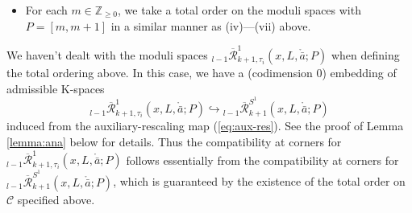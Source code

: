 \documentclass[a4paper]{article}
\numberwithin{equation}{section}
\begin{document}
\begin{itemize}
    \begin{equation}
    \left\{{}_l\overline{\mathcal{M}}(x_1,x_2;\{m\})|A_{H_t}(x_1)-A_{H_t}(x_2)=c\right\},
    \end{equation}
    \begin{equation}
    \left\{\overline{\mathcal{R}}_{k+1}(L,\bar{a};\{m\})|\theta_M(a)+(k-1)\varepsilon=c\right\},
    \end{equation}
    \begin{equation}
    \left\{\overline{\mathcal{R}}_{k+2,\vartheta}(L,\bar{a};\{m\})|\theta_M(a)+(k-1)\varepsilon=c\right\},
    \end{equation}
    \begin{equation}
    \left\{{}_l^{j,j+1}\overline{\mathcal{R}}_{k+1}^1(x,L,\ring{\bar{a}};\{m\})|\theta_M(a)+(k-1)\varepsilon=c\right\},
    \end{equation}
    \begin{equation}
    \left\{{}_{l-1}\overline{\mathcal{R}}_{k+1}^{S^1}(x,L,\ring{\bar{a}};\{m\})|\theta_M(a)+(k-1)\varepsilon=c\right\},
    \end{equation}
    \begin{equation}
    \left\{{}_l\overline{\mathcal{R}}_{k+1}^1(x,L,\ring{\bar{a}};\{m\})|\theta_M(a)+(k-1)\varepsilon=c\right\}.
    \end{equation}
    \item[(viii)] For each $m\in\mathbb{Z}_{\geq0}$, we take a total order on the moduli spaces with $P=[m,m+1]$ in a similar manner as (iv)---(vii) above.
\end{itemize}

We haven't dealt with the moduli spaces ${}_{l-1}\overline{\mathcal{R}}_{k+1,\tau_i}^1(x,L,\ring{\bar{a}};P)$ when defining the total ordering above. In this case, we have a (codimension 0) embedding of admissible K-spaces
\begin{equation}
{}_{l-1}\overline{\mathcal{R}}_{k+1,\tau_i}^1(x,L,\ring{\bar{a}};P)\hookrightarrow{}_{l-1}\overline{\mathcal{R}}_{k+1}^{S^1}(x,L,\ring{\bar{a}};P)
\end{equation}
induced from the auxiliary-rescaling map (\ref{eq:aux-res}). See the proof of Lemma \ref{lemma:ana} below for details. Thus the compatibility at corners for ${}_{l-1}\overline{\mathcal{R}}_{k+1,\tau_i}^1(x,L,\ring{\bar{a}};P)$ follows essentially from the compatibility at corners for ${}_{l-1}\overline{\mathcal{R}}_{k+1}^{S^1}(x,L,\ring{\bar{a}};P)$, which is guaranteed by the existence of the total order on $\mathcal{C}$ specified above.
\end{document}
